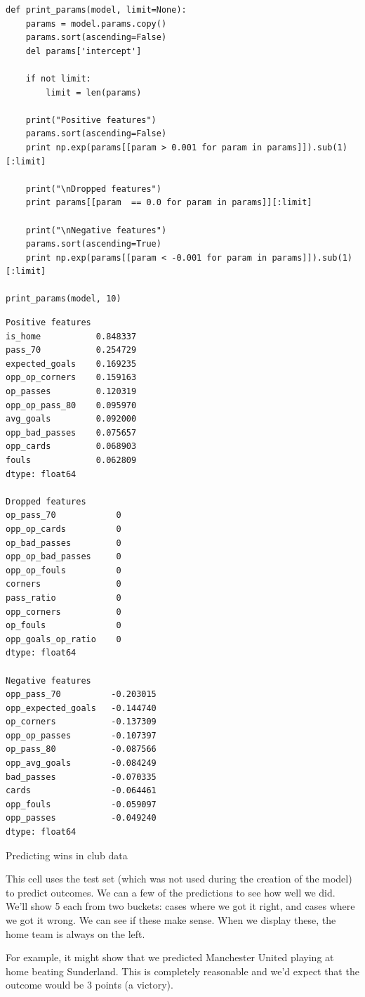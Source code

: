 \documentclass[12pt,fleqn]{article}\usepackage{common}
\begin{document}
\begin{verbatim}
def print_params(model, limit=None):    
    params = model.params.copy()
    params.sort(ascending=False)
    del params['intercept']
    
    if not limit:
        limit = len(params)

    print("Positive features")
    params.sort(ascending=False)
    print np.exp(params[[param > 0.001 for param in params]]).sub(1)[:limit]

    print("\nDropped features")
    print params[[param  == 0.0 for param in params]][:limit]

    print("\nNegative features")
    params.sort(ascending=True)
    print np.exp(params[[param < -0.001 for param in params]]).sub(1)[:limit]

print_params(model, 10)
\end{verbatim}

\begin{verbatim}
Positive features
is_home           0.848337
pass_70           0.254729
expected_goals    0.169235
opp_op_corners    0.159163
op_passes         0.120319
opp_op_pass_80    0.095970
avg_goals         0.092000
opp_bad_passes    0.075657
opp_cards         0.068903
fouls             0.062809
dtype: float64

Dropped features
op_pass_70            0
opp_op_cards          0
op_bad_passes         0
opp_op_bad_passes     0
opp_op_fouls          0
corners               0
pass_ratio            0
opp_corners           0
op_fouls              0
opp_goals_op_ratio    0
dtype: float64

Negative features
opp_pass_70          -0.203015
opp_expected_goals   -0.144740
op_corners           -0.137309
opp_op_passes        -0.107397
op_pass_80           -0.087566
opp_avg_goals        -0.084249
bad_passes           -0.070335
cards                -0.064461
opp_fouls            -0.059097
opp_passes           -0.049240
dtype: float64
\end{verbatim}

Predicting wins in club data

This cell uses the test set (which was not used during the creation of the
model) to predict outcomes. We can a few of the predictions to see how well
we did. We'll show 5 each from two buckets: cases where we got it right,
and cases where we got it wrong. We can see if these make sense. When we
display these, the home team is always on the left.

For example, it might show that we predicted Manchester United playing at
home beating Sunderland. This is completely reasonable and we'd expect that
the outcome would be 3 points (a victory).
\end{document}
